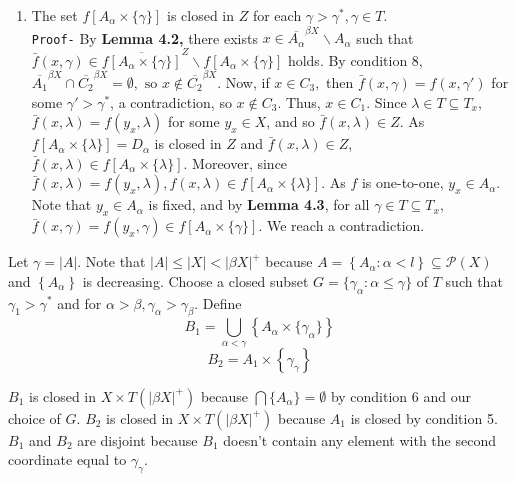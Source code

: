 \documentclass{article}
\begin{document}
\begin{enumerate}
\vskip 20pt
	
	
	\item The set $f\left[A_\alpha\times\{\gamma\}\right]$ is closed in $Z$ for each $\gamma>\gamma^*, \gamma\in T$.\\
	\texttt{Proof-} By \textbf{Lemma 4.2,} there exists $x\in \overline{A_\alpha}^{\beta X}\backslash A_\alpha$ such that $\bar{f}(x,\gamma)\in \overline{f\left[A_\alpha\times\{\gamma\}\right]}^Z \backslash f\left[A_\alpha\times \{\gamma\}\right]$ holds. By condition 8, $\overline{A_1}^{\beta X} \cap \overline{C_2}^{\beta X}=\emptyset, \mbox{ so }x\notin \overline{C_2}^{\beta X}.$ Now, if $x\in C_3,$ then $\bar{f}(x,\gamma)=f(x,\gamma')$ for some $\gamma'>\gamma^*$, a contradiction, so $x\notin C_3$. Thus, $x\in C_1.$ Since $\lambda \in T\subseteq T_x,$ $\bar{f}(x,\lambda)=f(y_x,\lambda)$ for some $y_x\in X$, and so $\bar{f}(x,\lambda)\in Z$. As $f\left[A_\alpha\times\{\lambda\}\right]=D_\alpha$ is closed in $Z$ and $\bar{f}(x,\lambda)\in Z$, $\bar{f}(x,\lambda)\in f\left[A_\alpha \times \{\lambda\}\right].$ Moreover, since $\bar{f}(x,\lambda)=f(y_x, \lambda), f(x,\lambda)\in f\left[A_\alpha \times \{\lambda\}\right].$ As $f$ is one-to-one, $y_x\in A_\alpha$. Note that $y_x\in A_\alpha$ is fixed, and by \textbf{Lemma 4.3}, for all $\gamma \in T\subseteq T_x,$ $\bar{f}(x,\gamma)=f(y_x,\gamma)\in f\left[A_\alpha \times \{\gamma\}\right].$ We reach a contradiction.
	
\end{enumerate}



\vskip 30pt


Let $\gamma=|A|$. Note that $|A|\leq |X|<|\beta X|^+$ because $A=\left\{A_\alpha: \alpha< l\right\} \subseteq \mathcal{P}(X)$ and $\left\{A_\alpha\right\}$ is decreasing. 
Choose a closed subset $G=\{\gamma_\alpha: \alpha\leq \gamma\}$ of $T$ such that $\gamma_1>\gamma^*$ and for $\alpha>\beta, \gamma_\alpha>\gamma_\beta$. Define 
$$B_1=\bigcup_{\alpha<\gamma} \left\{A_\alpha\times \{\gamma_\alpha\}\right\}$$
$$B_2=A_1\times \left\{\gamma_{\gamma}\right\}$$ \vskip 5pt

$B_1$ is closed in $X\times T(|\beta X|^+)$ because $\bigcap \{A_\alpha\}=\emptyset$ by condition 6 and our choice of $G$. $B_2$ is closed in $X\times T(|\beta X|^+)$ because $A_1$ is closed by condition 5. $B_1$ and $B_2$ are disjoint because $B_1$ doesn't contain any element with the second coordinate equal to $\gamma_\gamma$.

\vskip 15pt
\end{document}
